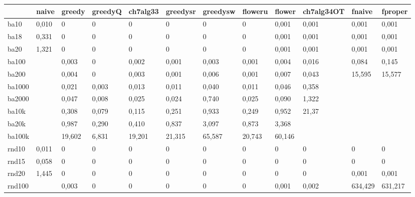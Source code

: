 \begin{landscape}
\begin{table}[h]
	\centering
	\begin{tabular}{llllllllllll}
		\hline
		& naive & greedy & greedyQ & ch7alg33 & greedysr & greedysw & floweru & flower & ch7alg34OT & fnaive  & fproper \\ \hline
		ba10    & 0,010 & 0      & 0       & 0        & 0        & 0        & 0       & 0,001  & 0,001      & 0,001   & 0,001   \\
		ba18    & 0,331 & 0      & 0       & 0        & 0        & 0        & 0       & 0,001  & 0,001      & 0,001   & 0,001   \\
		ba20    & 1,321 & 0      & 0       & 0        & 0        & 0        & 0       & 0,001  & 0,001      & 0,001   & 0,001   \\
		ba100   &       & 0,003  & 0       & 0,002    & 0,001    & 0,003    & 0,001   & 0,004  & 0,016      & 0,084   & 0,145   \\
		ba200   &       & 0,004  & 0       & 0,003    & 0,001    & 0,006    & 0,001   & 0,007  & 0,043      & 15,595  & 15,577  \\
		ba1000  &       & 0,021  & 0,003   & 0,013    & 0,011    & 0,040    & 0,011   & 0,046  & 0,358      &         &         \\
		ba2000  &       & 0,047  & 0,008   & 0,025    & 0,024    & 0,740    & 0,025   & 0,090  & 1,322      &         &         \\
		ba10k   &       & 0,308  & 0,079   & 0,115    & 0,251    & 0,933    & 0,249   & 0,952  & 21,37      &         &         \\
		ba20k   &       & 0,987  & 0,290   & 0,410    & 0,837    & 3,097    & 0,873   & 3,368  &            &         &         \\
		ba100k  &       & 19,602 & 6,831   & 19,201   & 21,315   & 65,587   & 20,743  & 60,146 &            &         &         \\
		rnd10   & 0,011 & 0      & 0       & 0        & 0        & 0        & 0       & 0      & 0          & 0       & 0       \\
		rnd15   & 0,058 & 0      & 0       & 0        & 0        & 0        & 0       & 0      & 0          & 0       & 0       \\
		rnd20   & 1,445 & 0      & 0       & 0        & 0        & 0        & 0       & 0      & 0          & 0,001   & 0,001   \\
		rnd100  &       & 0,003  & 0       & 0        & 0        & 0        & 0       & 0,001  & 0,002      & 634,429 & 631,217 \\

\end{tabular}
\end{table}
\end{landscape}
